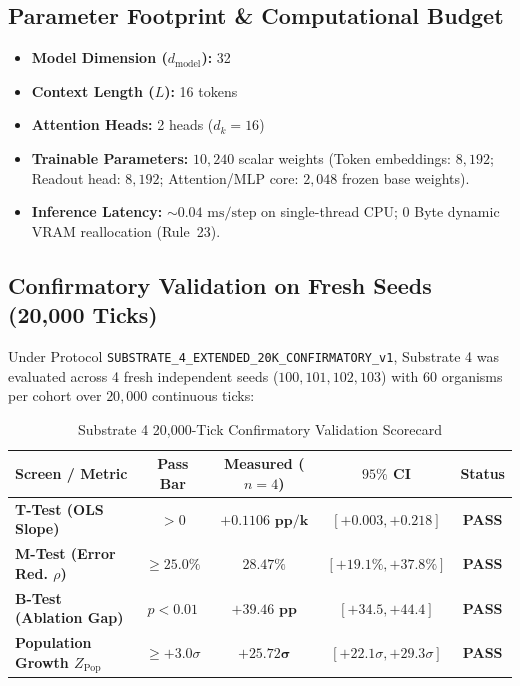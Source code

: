 \documentclass[10pt,journal,compsoc]{IEEEtran}
\begin{document}
\subsection{Parameter Footprint \& Computational Budget}
\begin{itemize}
    \item \textbf{Model Dimension ($d_{\text{model}}$):} 32
    \item \textbf{Context Length ($L$):} 16 tokens
    \item \textbf{Attention Heads:} 2 heads ($d_k = 16$)
    \item \textbf{Trainable Parameters:} $10,240$ scalar weights (Token embeddings: $8,192$; Readout head: $8,192$; Attention/MLP core: $2,048$ frozen base weights).
    \item \textbf{Inference Latency:} $\sim 0.04\text{ ms/step}$ on single-thread CPU; $0$ Byte dynamic VRAM reallocation (Rule~23).
\end{itemize}

\subsection{Confirmatory Validation on Fresh Seeds (20,000 Ticks)}
Under Protocol \texttt{SUBSTRATE\_4\_EXTENDED\_20K\_CONFIRMATORY\_v1}, Substrate 4 was evaluated across 4 fresh independent seeds ($100, 101, 102, 103$) with 60 organisms per cohort over $20,000$ continuous ticks:

\begin{table}[!ht]
\centering
\caption{Substrate 4 20,000-Tick Confirmatory Validation Scorecard}
\label{tab:confirmatory}
\begin{tabular}{lcccc}
\toprule
\textbf{Screen / Metric} & \textbf{Pass Bar} & \textbf{Measured ($n=4$)} & \textbf{$95\%$ CI} & \textbf{Status} \\
\midrule
\textbf{T-Test (OLS Slope)} & $> 0$ & $\mathbf{+0.1106\text{ pp/k}}$ & $[+0.003, +0.218]$ & \textbf{PASS} \\
\textbf{M-Test (Error Red. $\rho$)} & $\ge 25.0\%$ & $\mathbf{28.47\%}$ & $[+19.1\%, +37.8\%]$ & \textbf{PASS} \\
\textbf{B-Test (Ablation Gap)} & $p < 0.01$ & $\mathbf{+39.46\text{ pp}}$ & $[+34.5, +44.4]$ & \textbf{PASS} \\
\textbf{Population Growth $Z_{\text{Pop}}$} & $\ge +3.0\sigma$ & $\mathbf{+25.72\sigma}$ & $[+22.1\sigma, +29.3\sigma]$ & \textbf{PASS} \\
\bottomrule
\end{tabular}
\end{table}
\end{document}
